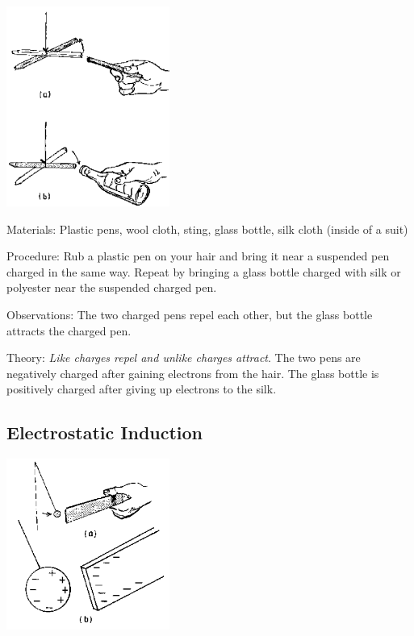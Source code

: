 \begin{multicols}{2}
\begin{center}
\includegraphics[width=0.4\textwidth]{./img/source/law-electrostatics.png}
\end{center}

\begin{description*}
\item[Materials:]{Plastic pens, wool cloth, sting, glass bottle, silk cloth (inside of a suit)}
\item[Procedure:]{Rub a plastic pen on your hair and bring it near a suspended pen charged in the same way. Repeat by bringing a glass bottle charged with silk or polyester near the suspended charged pen.}
\item[Observations:]{The two charged pens repel each other, but the glass bottle attracts the charged pen.}
\item[Theory:]{\emph{Like charges repel and unlike charges attract}. The two pens are negatively charged after gaining electrons from the hair. The glass bottle is positively charged after giving up electrons to the silk.}
\end{description*}

\subsection{Electrostatic Induction}

\begin{center}
\includegraphics[width=0.4\textwidth]{./img/source/elec-induction.png}
\end{center}


\end{multicols}
